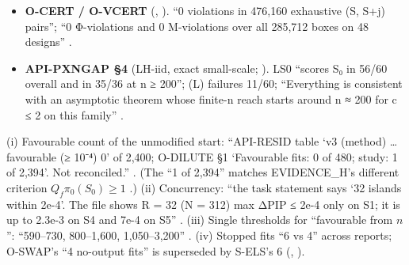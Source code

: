 \begin{itemize}
C carries 11\% and the size term 6\%''; ``About 7 of the 14 truths are invisible at n = 200 for every c''; per-cell medians of
$\pi_0(S_0)$ $10^{-11.1}$ to $10^{-25.6}$ .
\item {} \textbf{O-CERT / O-VCERT} (, ). ``0 violations in 476,160 exhaustive (S, S+j) pairs''; ``0 Φ-violations
and 0 M-violations over all 285,712 boxes on 48 designs'' .
\item \textbf{API-PXNGAP \S4} (LH-iid, exact small-scale; ). LS0 ``scores S₀ in 56/60 overall and in 35/36 at n ≥ 200''; (L) failures
11/60; ``Everything is consistent with an asymptotic theorem whose finite-n reach starts around n ≈ 200 for c ≤ 2 on this family''
.
\end{itemize}

\begin{uncertain}
(i) Favourable count of the unmodified start: ``API-RESID table `v3 (method) … favourable (≥ 10⁻⁴) 0' of 2,400; O-DILUTE §1
`Favourable fits: 0 of 480; study: 1 of 2,394'. Not reconciled.'' . (The ``1 of 2,394'' matches
EVIDENCE\_H's different criterion $Q_f\pi_0(S_0)\ge1$ .)
(ii) Concurrency: ``the task statement says `32 islands within 2e-4'. The file shows R = 32 (N = 312) max ΔPIP ≤ 2e-4 only on S1; it is up to
2.3e-3 on S4 and 7e-4 on S5'' .
(iii) Single thresholds for ``favourable from $n$'': ``590–730, 800–1,600, 1,050–3,200'' .
(iv) Stopped fits ``6 vs 4'' across reports; O-SWAP's ``4 no-output fits'' is superseded by S-ELS's 6 (, ).
\end{uncertain}


